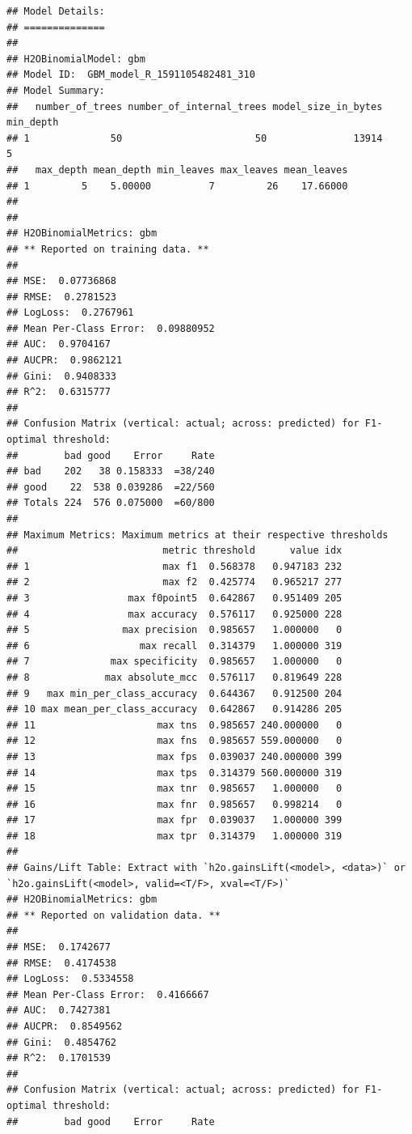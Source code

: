 \documentclass[
]{book}
\begin{document}
\begin{verbatim}
## Model Details:
## ==============
## 
## H2OBinomialModel: gbm
## Model ID:  GBM_model_R_1591105482481_310 
## Model Summary: 
##   number_of_trees number_of_internal_trees model_size_in_bytes min_depth
## 1              50                       50               13914         5
##   max_depth mean_depth min_leaves max_leaves mean_leaves
## 1         5    5.00000          7         26    17.66000
## 
## 
## H2OBinomialMetrics: gbm
## ** Reported on training data. **
## 
## MSE:  0.07736868
## RMSE:  0.2781523
## LogLoss:  0.2767961
## Mean Per-Class Error:  0.09880952
## AUC:  0.9704167
## AUCPR:  0.9862121
## Gini:  0.9408333
## R^2:  0.6315777
## 
## Confusion Matrix (vertical: actual; across: predicted) for F1-optimal threshold:
##        bad good    Error     Rate
## bad    202   38 0.158333  =38/240
## good    22  538 0.039286  =22/560
## Totals 224  576 0.075000  =60/800
## 
## Maximum Metrics: Maximum metrics at their respective thresholds
##                         metric threshold      value idx
## 1                       max f1  0.568378   0.947183 232
## 2                       max f2  0.425774   0.965217 277
## 3                 max f0point5  0.642867   0.951409 205
## 4                 max accuracy  0.576117   0.925000 228
## 5                max precision  0.985657   1.000000   0
## 6                   max recall  0.314379   1.000000 319
## 7              max specificity  0.985657   1.000000   0
## 8             max absolute_mcc  0.576117   0.819649 228
## 9   max min_per_class_accuracy  0.644367   0.912500 204
## 10 max mean_per_class_accuracy  0.642867   0.914286 205
## 11                     max tns  0.985657 240.000000   0
## 12                     max fns  0.985657 559.000000   0
## 13                     max fps  0.039037 240.000000 399
## 14                     max tps  0.314379 560.000000 319
## 15                     max tnr  0.985657   1.000000   0
## 16                     max fnr  0.985657   0.998214   0
## 17                     max fpr  0.039037   1.000000 399
## 18                     max tpr  0.314379   1.000000 319
## 
## Gains/Lift Table: Extract with `h2o.gainsLift(<model>, <data>)` or `h2o.gainsLift(<model>, valid=<T/F>, xval=<T/F>)`
## H2OBinomialMetrics: gbm
## ** Reported on validation data. **
## 
## MSE:  0.1742677
## RMSE:  0.4174538
## LogLoss:  0.5334558
## Mean Per-Class Error:  0.4166667
## AUC:  0.7427381
## AUCPR:  0.8549562
## Gini:  0.4854762
## R^2:  0.1701539
## 
## Confusion Matrix (vertical: actual; across: predicted) for F1-optimal threshold:
##        bad good    Error     Rate

\end{verbatim}
\end{document}
